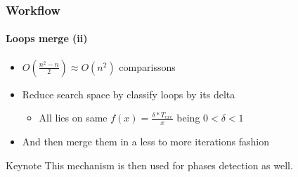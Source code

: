 \documentclass{beamer}
\begin{document}
\begin{frame}
\frametitle{Workflow}
\framesubtitle{Loops merge (ii)}
\begin{itemize}
	\item $O(\frac{n^{2}-n}{2}) \approx O(n^{2})$ comparissons
	\pause
	\item Reduce search space by classify loops by its delta
	\begin{itemize}
		\item All lies on same $f(x)=\frac{\delta*T_{exe}}{x}$ being $0 < \delta < 1$
	\end{itemize}
	\item And then merge them in a less to more iterations fashion
\end{itemize}
\pause
\begin{block}{Keynote}
	This mechanism is then used for phases detection as well.
\end{block}
\end{frame}
\end{document}

